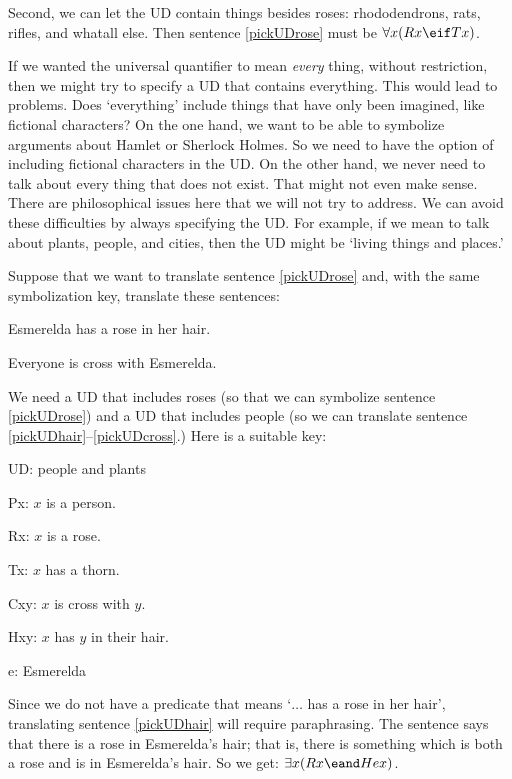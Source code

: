 Second, we can let the UD contain things besides roses: rhododendrons, rats, rifles, and whatall else. Then sentence \ref{pickUDrose} must be $\forall x(Rx \eif Tx)$.

If we wanted the universal quantifier to mean \emph{every} thing, without restriction, then we might try to specify a UD that contains everything. This would lead to problems. Does `everything' include things that have only been imagined, like fictional characters? On the one hand, we want to be able to symbolize arguments about Hamlet or Sherlock Holmes. So we need to have the option of including fictional characters in the UD. On the other hand, we never need to talk about every thing that does not exist. That might not even make sense. There are philosophical issues here that we will not try to address. We can avoid these difficulties by always specifying the UD. For example, if we mean to talk about plants, people, and cities, then the UD might be `living things and places.'

Suppose that we want to translate sentence \ref{pickUDrose} and, with the same symbolization key, translate these sentences:

\begin{earg}
\item[\ex{pickUDhair}] Esmerelda has a rose in her hair.
\item[\ex{pickUDcross}] Everyone is cross with Esmerelda.
\end{earg}

We need a UD that includes roses (so that we can symbolize sentence \ref{pickUDrose}) and a UD that includes people (so we can translate sentence \ref{pickUDhair}--\ref{pickUDcross}.) Here is a suitable key:
\begin{ekey}
\item[UD:] people and plants
\item[Px:] $x$ is a person.
\item[Rx:] $x$ is a rose.
\item[Tx:] $x$ has a thorn.
\item[Cxy:] $x$ is cross with $y$.
\item[Hxy:] $x$ has $y$ in their hair.
\item[e:] Esmerelda
\end{ekey}

Since we do not have a predicate that means `$\ldots$ has a rose in her hair', translating sentence \ref{pickUDhair} will require paraphrasing. The sentence says that there is a rose in Esmerelda's hair; that is, there is something which is both a rose and is in Esmerelda's hair. So we get: $\exists x(Rx \eand Hex)$.

